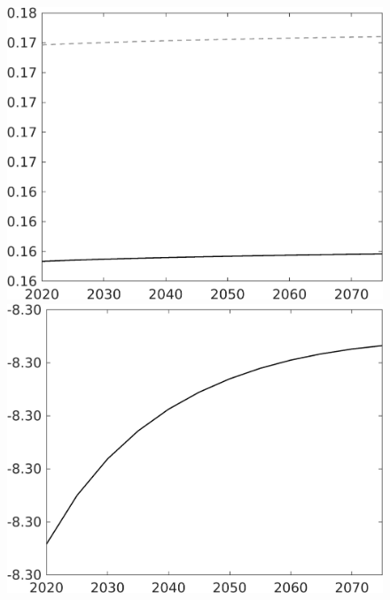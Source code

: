 \documentclass[12pt]{article}
\begin{document}
\begin{figure}[h!!]
\begin{minipage}[]{0.32\textwidth}
	\end{minipage}	 
	\begin{minipage}[]{0.32\textwidth}
		\includegraphics[width=1\textwidth]{../../codding_model/own_basedOnFried/optimalPol_010922_revision/figures/all_13Sept22/CompTaul_LFBAU_Reg0_Ln_spillover0_nsk0_xgr1_knspil0_sep1_countec0_GovRev0_etaa0.79_lgd0.png}
	\end{minipage}	
	\begin{minipage}[]{0.32\textwidth}
		\includegraphics[width=1\textwidth]{../../codding_model/own_basedOnFried/optimalPol_010922_revision/figures/all_13Sept22/CompTaul_LFBAUPer_Reg0_Lf_spillover0_nsk0_xgr1_knspil0_sep1_countec0_GovRev0_etaa0.79.png}

\end{minipage}
\end{figure}
\end{document}
